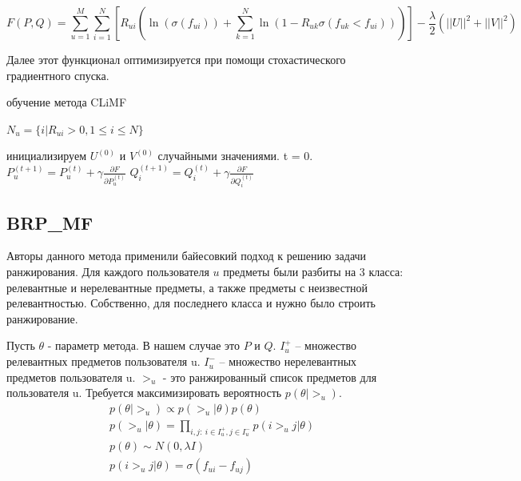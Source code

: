 \documentclass[a4paper,12pt]{article}
\begin{document}
\begin{equation*}
	F(P, Q) = \sum_{u=1}^M \sum_{i=1}^N [R_{ui}(\ln(\sigma(f_{ui})) + \sum_{k=1}^N \ln(1 - R_{uk}\sigma(f_{uk} < f_{ui})))] - \frac{\lambda}{2}({||U||}^2 + {||V||}^2 ) 
	\end{equation*}	

Далее этот функционал оптимизируется при помощи стохастического градиентного спуска.

\begin{algorithm}[h]
\caption{обучение метода CLiMF}
\begin{algorithmic}[1]
\State $N_u = \{i | R_{ui} > 0, 1 \leq i \leq N\}$
\EndFor

инициализируем $U^{(0)}$ и $V^{(0)}$ случайными значениями. t = 0.
\Repeat {} 
		\State $P_u^{(t+1)} = P_u^{(t)} + \gamma \frac{\partial F}{\partial P_u^{(t)}}$
				\State 	$Q_i^{(t+1)} = Q_i^{(t)} + \gamma \frac{\partial F}{\partial 	  																						Q_i^{(t)}}$		
			\EndFor	
	\EndFor 
{}

\end{algorithmic}
\label{alg:climf}
\end{algorithm}
\newpage
\subsection{BRP\_MF}  	

Авторы данного метода применили байесовкий подход к решению задачи ранжирования. Для каждого пользователя $u$  предметы были разбиты на 3 класса: релевантные и нерелевантные предметы, а также предметы с неизвестной релевантностью. Собственно, для последнего класса и нужно было строить ранжирование. 



Пусть $\theta$ - параметр метода. В нашем случае это $P$ и $Q$.  $I_u^+$ -- множество релевантных предметов пользователя u. $I_u^-$ -- множество нерелевантных предметов пользователя u.  $>_u$ - это ранжированный список предметов для пользователя u. Требуется максимизировать вероятность $p(\theta|>_u)$.
\begin{equation*}
\begin{split}
	& p(\theta| >_u) \propto p(>_u| \theta)p(\theta) \\
	& p(>_u| \theta) = \prod_{i, j: \ i \in I_u^+, j \in I_u^-}p(i >_u j| \theta)\\
	& p(\theta) \sim N(0, \lambda I) \\
	& p(i >_u j| \theta) = \sigma(f_{ui} - f_{uj}) 
\end{split}
\end{equation*}
\end{document}
